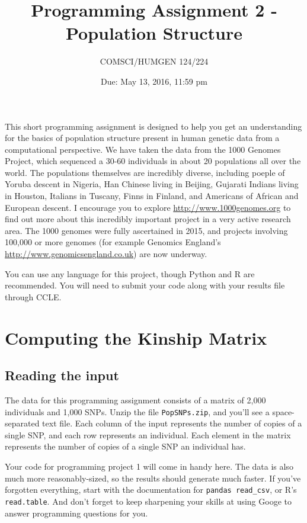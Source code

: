 \documentclass{article}
\begin{document}
\title{Programming Assignment 2 - Population Structure}

\author{COMSCI/HUMGEN 124/224}

\date{Due: May 13, 2016, 11:59 pm}

\maketitle

This short programming assignment is designed to help you get an
understanding for the basics of population structure present in
human genetic data from a computational perspective. We have taken
the data from the 1000 Genomes Project, which sequenced a 30-60
individuals in about 20 populations all over the world. The populations
themselves are incredibly diverse, including poeple of Yoruba
descent in Nigeria, Han Chinese living in Beijing,
Gujarati Indians living in Houston, Italians in Tuscany,
Finns in Finland, and Americans of African and European descent.
I encourage you to explore \url{http://www.1000genomes.org} to
find out more about this incredibly important project in a very
active research area. The 1000 genomes were fully ascertained in 2015,
and projects involving 100,000 or more genomes (for example
Genomics England's \url{http://www.genomicsengland.co.uk}) are now underway.

You can use any language for this project,
though Python and R are recommended. You will
need to submit your code along with your results file through CCLE.


\section*{Computing the Kinship Matrix}

\subsection*{Reading the input}
The data for this programming assignment consists of a matrix
of 2,000 individuals and 1,000 SNPs. Unzip the file \verb!PopSNPs.zip!,
and you'll see a space-separated text file.
Each column of the input represents the number of copies of a single SNP, and each row
represents an individual. Each element in the matrix represents
the number of copies of a single SNP an individual has.

Your code for programming project 1 will come in handy here.
The data is also much more reasonably-sized, so the results
should generate much faster. If you've forgotten everything,
start with the documentation for \verb!pandas read_csv!,
or R's \texttt{read.table}. And don't forget to keep sharpening
your skills at using Googe to answer programming questions for you.
\end{document}
